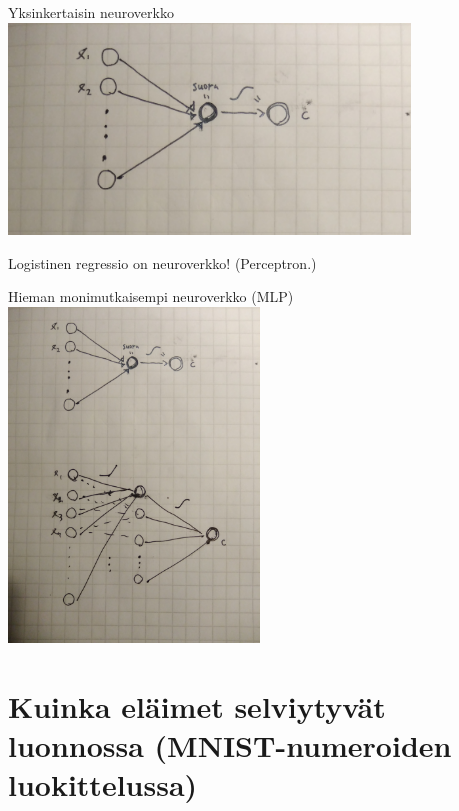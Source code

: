 \documentclass[presentation]{beamer}
\begin{document}
\begin{frame}{Yksinkertaisin neuroverkko}
        \includegraphics[width=0.8\textwidth]{logistinen_perceptron.jpg}
        
        \pause
        Logistinen regressio on neuroverkko! (Perceptron.)
\end{frame}

\begin{frame}{Hieman monimutkaisempi neuroverkko (MLP)}
    \includegraphics[width=0.5\textwidth]{mlp.jpg}
\end{frame}


\section{Kuinka eläimet selviytyvät luonnossa (MNIST-numeroiden luokittelussa)}

\begin{frame}{}
  \tableofcontents[currentsection]
\end{frame}
\end{document}
